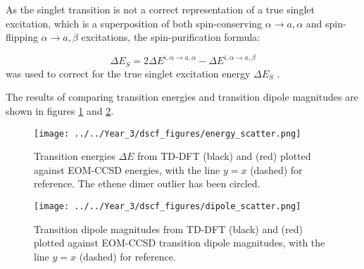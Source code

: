 As the \dscf singlet transition is not a correct representation of a true singlet
excitation, which is a superposition of both spin-conserving $\alpha \rightarrow a,
\alpha$ and spin-flipping $\alpha \rightarrow a, \beta$ excitations, the spin-purification 
formula:

\begin{equation}
\Delta E_S = 2\Delta E^{i,\alpha \rightarrow a, \alpha} - \Delta E^{i,\alpha \rightarrow a, \beta}
\end{equation}
%
was used to correct for the true singlet excitation energy $\Delta E_S$ \cite{Ziegler1977}.

The results of comparing transition energies and transition dipole magnitudes are
shown in figures \ref{fig:energy_scatter} and \ref{fig:dipole_scatter}.

\begin{figure}
\centering
\texttt{[image: ../../Year\_3/dscf\_figures/energy\_scatter.png]}
\caption{Transition energies $\Delta E$ from TD-DFT (black) and \dscf (red)
 plotted against EOM-CCSD energies, with the line $y=x$ (dashed) for reference.
 The ethene dimer outlier has been circled.}
\label{fig:energy_scatter}
\end{figure}

\begin{figure}
\centering
\texttt{[image: ../../Year\_3/dscf\_figures/dipole\_scatter.png]}
\caption{Transition dipole magnitudes from TD-DFT (black) and \dscf (red) plotted
against EOM-CCSD transition dipole magnitudes, with the line $y=x$ (dashed) for 
reference.}
\label{fig:dipole_scatter}
\end{figure}

